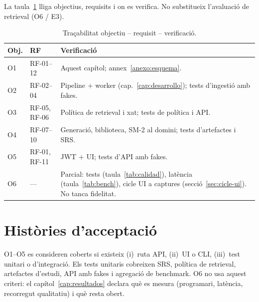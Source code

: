 La taula~\ref{tab:trazas} lliga objectius, requisits i on es verifica. No substitueix l'avaluació de retrieval (O6 / E3).

\begin{table}[htbp]
\centering
\caption{Traçabilitat objectiu -- requisit -- verificació.}
\label{tab:trazas}
\small
\begin{tabularx}{\textwidth}{llX}
\toprule
Obj. & RF & Verificació \\
\midrule
O1 & RF-01--12 & Aquest capítol; annex~\ref{anexo:esquema}. \\
O2 & RF-02--04 & Pipeline + worker (cap.~\ref{cap:desarrollo}); tests d'ingestió amb fakes. \\
O3 & RF-05, RF-06 & Política de retrieval i xat; tests de política i API. \\
O4 & RF-07--10 & Generació, biblioteca, SM-2 al domini; tests d'artefactes i SRS. \\
O5 & RF-01, RF-11 & JWT + UI; tests d'API amb fakes. \\
O6 & --- & Parcial: tests (taula~\ref{tab:calidad}), latència (taula~\ref{tab:bench}), cicle UI a captures (secció~\ref{sec:cicle-ui}). No tanca fidelitat. \\
\bottomrule
\end{tabularx}
\end{table}

\section{Històries d'acceptació}

O1--O5 es consideren coberts si existeix (i)~ruta API, (ii)~UI o CLI, (iii)~test unitari o d'integració. Els tests unitaris cobreixen SRS, política de retrieval, artefactes d'estudi, API amb fakes i agregació de benchmark. O6 no usa aquest criteri: el capítol~\ref{cap:resultados} declara què es mesura (programari, latència, recorregut qualitatiu) i què resta obert.
